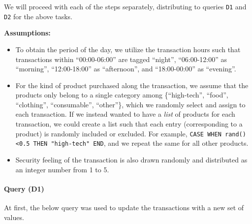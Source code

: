 We will proceed with each of the steps separately, distributing to
queries \texttt{D1} and \texttt{D2} for the above tasks.

    \textbf{Assumptions:}

\begin{itemize}
\tightlist
\item
  To obtain the period of the day, we utilize the transaction hours such
  that transactions within ``00:00-06:00'' are tagged ``night'',
  ``06:00-12:00'' as ``morning'', ``12:00-18:00'' as ``afternoon'', and
  ``18:00-00:00'' as ``evening''.
\item
  For the kind of product purchased along the transaction, we assume
  that the products only belong to a single category among
  \{``high-tech'', ``food'', ``clothing'', ``consumable'', ``other''\},
  which we randomly select and assign to each transaction. If we instead
  wanted to have a \emph{list} of products for each transaction, we
  could create a list such that each entry (corresponding to a product)
  is randomly included or excluded. For example,
  \texttt{CASE\ WHEN\ rand()\textless{}0.5\ THEN\ "high-tech"\ END}, and
  we repeat the same for all other products.
\item
  Security feeling of the transaction is also drawn randomly and
  distributed as an integer number from 1 to 5.
\end{itemize}

    \hypertarget{query-d1}{%
\paragraph{Query (D1)}\label{query-d1}}

    At first, the below query was used to update the transactions with a new
set of values.

